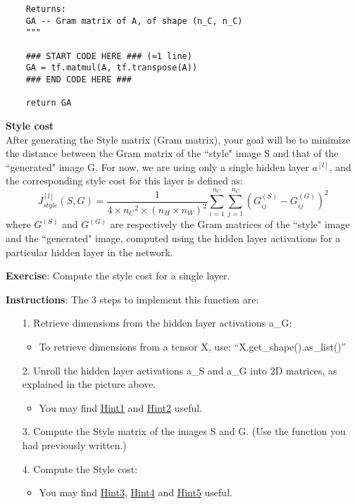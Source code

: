 {\begin{verbatim}
    Returns:
    GA -- Gram matrix of A, of shape (n_C, n_C)
    """
    
    ### START CODE HERE ### (≈1 line)
    GA = tf.matmul(A, tf.transpose(A))
    ### END CODE HERE ###
    
    return GA
\end{verbatim}

\clearpage
{\textbf{Style cost}}\\

After generating the Style matrix (Gram matrix), your goal will be to minimize the distance between the Gram matrix of the ``style" image S and that of the ``generated" image G. For now, we are using only a single hidden layer $a^{[l]}$, and the corresponding style cost for this layer is defined as: 
\begin{equation}
J_{style}^{[l]}(S,G) = \frac{1}{4 \times {n_C}^2 \times (n_H \times n_W)^2} \sum _{i=1}^{n_C}\sum_{j=1}^{n_C}(G^{(S)}_{ij} - G^{(G)}_{ij})^2
\end{equation}
where $G^{(S)}$ and $G^{(G)}$ are respectively the Gram matrices of the ``style" image and the ``generated" image, computed using the hidden layer activations for a particular hidden layer in the network.  


{\textbf{Exercise}}: Compute the style cost for a single layer. 

{\textbf{Instructions}}: The 3 steps to implement this function are:
\begin{itemize}
\item[1.] Retrieve dimensions from the hidden layer activations a\_G: 
   \begin{itemize}
    \item To retrieve dimensions from a tensor X, use: ``X.get\_shape().as\_list()''
    \end{itemize}
\item[2.] Unroll the hidden layer activations a\_S and a\_G into 2D matrices, as explained in the picture above.
    \begin{itemize}
    \item You may find \href{https://www.tensorflow.org/versions/r1.3/api_docs/python/tf/transpose}{Hint1} and \href{https://www.tensorflow.org/versions/r1.2/api_docs/python/tf/reshape}{Hint2} useful.
    \end{itemize}
\item[3.] Compute the Style matrix of the images S and G. (Use the function you had previously written.) 
\item[4.] Compute the Style cost:
    \begin{itemize}
    \item You may find \href{https://www.tensorflow.org/api_docs/python/tf/reduce_sum}{Hint3}, \href{https://www.tensorflow.org/api_docs/python/tf/square}{Hint4} and \href{https://www.tensorflow.org/api_docs/python/tf/subtract}{Hint5} useful.
    \end{itemize}
\end{itemize}

}
